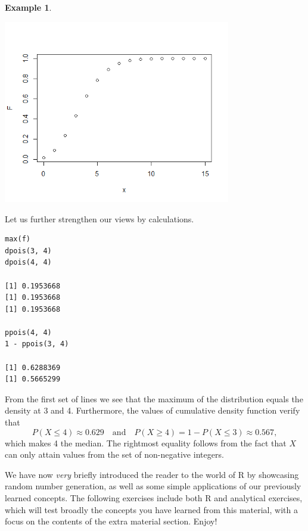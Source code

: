 \documentclass[12pt,a4paper,leqno]{report}
\theoremstyle{plain}
\theoremstyle{definition}
\newtheorem{esim}[equation]{Example}
\begin{document}
\begin{esim}
\begin{center}
\includegraphics[height = 8cm]{ppois.png}
\end{center}

Let us further strengthen our views by calculations.
\begin{verbatim}
max(f)
dpois(3, 4)
dpois(4, 4)

[1] 0.1953668
[1] 0.1953668
[1] 0.1953668

ppois(4, 4)
1 - ppois(3, 4)

[1] 0.6288369
[1] 0.5665299
\end{verbatim}

From the first set of lines we see that the maximum of the distribution equals the density at 3 and 4. Furthermore, the values of cumulative density function verify that
\[
P(X \leq 4) \approx 0.629 \quad \text{and} \quad P(X \geq 4) = 1 - P(X \leq 3) \approx 0.567,
\]
which makes 4 the median. The rightmost equality follows from the fact that $X$ can only attain values from the set of non-negative integers.
\end{esim}

We have now \emph{very} briefly introduced the reader to the world of R by showcasing random number generation, as well as some simple applications of our previously learned concepts. The following exercises include both R and analytical exercises, which will test broadly the concepts you have learned from this material, with a focus on the contents of the extra material section. Enjoy!
\end{document}
